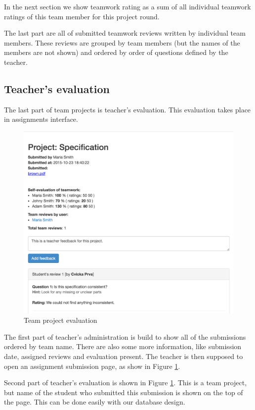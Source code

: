 In the next section we show teamwork rating as a sum of all individual teamwork ratings of this team member for this project round. 

The last part are all of submitted teamwork reviews written by individual team members. These reviews are grouped by team members (but the names of the members are not shown) and ordered by order of questions defined by the teacher. 

\subsection{Teacher's evaluation}
The last part of team projects is teacher's evaluation. This evaluation takes place in assignments interface.

\begin{figure}[h]
    \centering
    \includegraphics[width=\textwidth]{images/teamprojectevaluation.png}
    \caption{Team project evaluation}
    \label{team_submission_admin}
\end{figure}

The first part of teacher's administration is build to show all of the submissions ordered by team name. There are also some more information, like submission date, assigned reviews and evaluation present. The teacher is then supposed to open an assignment submission page, as show in Figure \ref{team_submission_admin}.

Second part of teacher's evaluation is shown in Figure \ref{team_submission_admin}. This is a team project, but name of the student who submitted this submission is shown on the top of the page. This can be done easily with our database design. 

